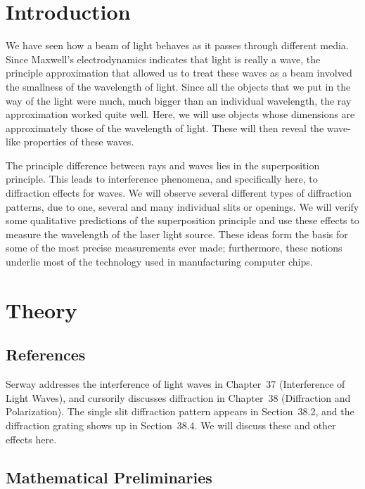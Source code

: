 \section{Introduction}

We have seen how a beam of light behaves as it passes through different 
media. Since Maxwell's electrodynamics indicates that light is really a 
wave, the principle approximation that allowed us to treat these waves as
a beam involved the smallness of the wavelength of light. Since all the 
objects that we put in the way of the light were much, much bigger than
an individual wavelength, the ray approximation worked quite well. Here,
we will use objects whose dimensions are approximately those of the 
wavelength of light. These will then reveal the wave-like properties of 
these waves.

The principle difference between rays and waves lies in the 
superposition principle. This leads to interference phenomena, and
specifically here, to diffraction effects for waves. We will observe several 
different types of diffraction patterns, due to one, several and many
individual slits or openings. We will verify some qualitative predictions
of the superposition principle and use these effects to measure the 
wavelength of the laser light source. These ideas form the basis for some
of the most precise measurements ever made; furthermore, these notions 
underlie most of the technology used in manufacturing computer chips.

\section{Theory}

\subsection{References}

Serway addresses the interference of light waves in Chapter~37 
(Interference of Light Waves), and cursorily discusses diffraction
in Chapter~38 (Diffraction and Polarization). The single slit
diffraction pattern appears in Section~38.2, and the diffraction
grating shows up in Section~38.4. We will discuss these and other
effects here.

\subsection{Mathematical Preliminaries}


